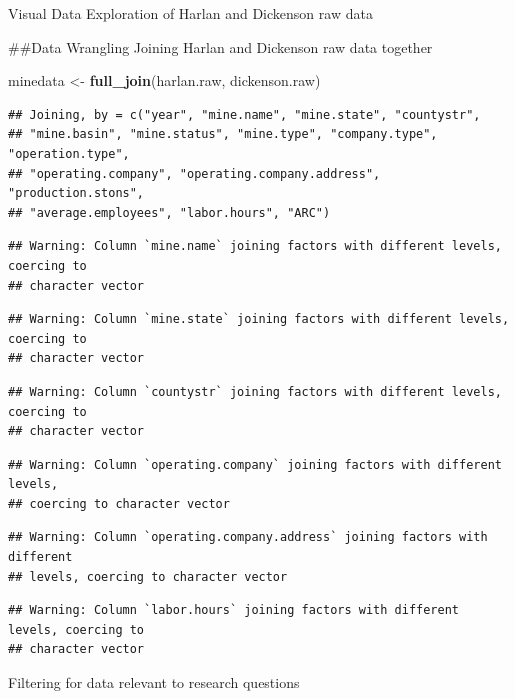 \documentclass[12pt,]{article}
\newenvironment{Shaded}{\begin{snugshade}}{\end{snugshade}}
\newcommand{\KeywordTok}[1]{\textcolor[rgb]{0.13,0.29,0.53}{\textbf{#1}}}
\newcommand{\NormalTok}[1]{#1}
\newcommand{\StringTok}[1]{\textcolor[rgb]{0.31,0.60,0.02}{#1}}
\begin{document}
Visual Data Exploration of Harlan and Dickenson raw data

\#\#Data Wrangling Joining Harlan and Dickenson raw data together

\begin{Shaded}
\begin{Highlighting}[]
\NormalTok{minedata <-}\StringTok{ }\KeywordTok{full_join}\NormalTok{(harlan.raw, dickenson.raw)}
\end{Highlighting}
\end{Shaded}

\begin{verbatim}
## Joining, by = c("year", "mine.name", "mine.state", "countystr",
## "mine.basin", "mine.status", "mine.type", "company.type", "operation.type",
## "operating.company", "operating.company.address", "production.stons",
## "average.employees", "labor.hours", "ARC")
\end{verbatim}

\begin{verbatim}
## Warning: Column `mine.name` joining factors with different levels, coercing to
## character vector
\end{verbatim}

\begin{verbatim}
## Warning: Column `mine.state` joining factors with different levels, coercing to
## character vector
\end{verbatim}

\begin{verbatim}
## Warning: Column `countystr` joining factors with different levels, coercing to
## character vector
\end{verbatim}

\begin{verbatim}
## Warning: Column `operating.company` joining factors with different levels,
## coercing to character vector
\end{verbatim}

\begin{verbatim}
## Warning: Column `operating.company.address` joining factors with different
## levels, coercing to character vector
\end{verbatim}

\begin{verbatim}
## Warning: Column `labor.hours` joining factors with different levels, coercing to
## character vector
\end{verbatim}

Filtering for data relevant to research questions
\end{document}
